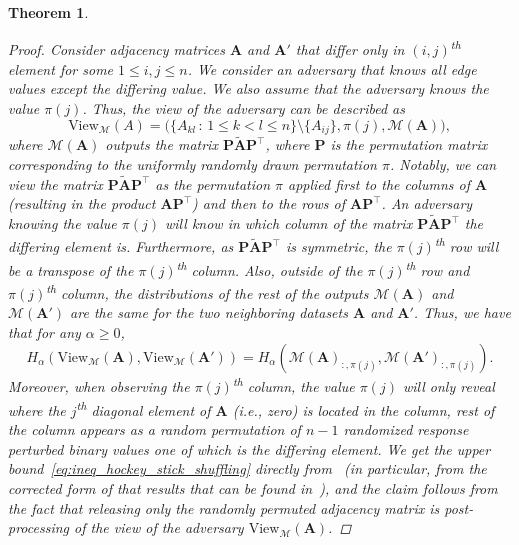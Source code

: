 \documentclass[11pt]{article}
\theoremstyle{plain}
\newtheorem{theorem}{Theorem}[section]
\theoremstyle{definition}
\theoremstyle{remark}
\newcommand{\view}[1]{\text{View}_{\mathcal M}(#1)}
\begin{document}
\begin{theorem}
\begin{proof}
Consider adjacency matrices $\mathbf{A}$ and $\mathbf{A}'$ that differ only in $(i,j)$\textsuperscript{th} element for some $1 \leq i,j \leq n$.
We consider an adversary that knows all edge values except the differing value. We also assume that the adversary knows the value $\pi(j)$. Thus, the view of the adversary can be described as
$$
\view{A} = \big( \{ A_{kl} \, : \, 1 \leq k < l \leq n\} \setminus \{A_{ij}\}, \pi(j), \mathcal{M}(\mathbf{A}) \big),
$$
where $\mathcal{M}(\mathbf{A})$ outputs the matrix $ \mathbf{P}\widetilde{\mathbf{A}}\mathbf{P}^{\top}$, where $ \mathbf{P}$ is the permutation matrix corresponding to the uniformly randomly drawn permutation $\pi$. Notably, we can view the matrix  $ \mathbf{P}\widetilde{\mathbf{A}}\mathbf{P}^{\top}$ as the permutation $\pi$ applied first to the columns of $\mathbf{A}$ (resulting in the product $\mathbf{A}\mathbf{P}^{\top}$) and then to the rows of $\mathbf{A}\mathbf{P}^{\top}$.
An adversary knowing the value $\pi(j)$ will know in which column of the matrix $ \mathbf{P}\widetilde{\mathbf{A}}\mathbf{P}^{\top}$ the differing element is. Furthermore, as $ \mathbf{P}\widetilde{\mathbf{A}}\mathbf{P}^{\top}$ is symmetric, the $\pi(j)$\textsuperscript{th} row will be a transpose of the $\pi(j)$\textsuperscript{th} column. Also, outside of the $\pi(j)$\textsuperscript{th} row and $\pi(j)$\textsuperscript{th} column, the distributions of the rest of the outputs $\mathcal{M}(\mathbf{A})$ and $\mathcal{M}(\mathbf{A}')$ are the same for the two neighboring datasets $\mathbf{A}$ and $\mathbf{A}'$. Thus, we have that for any $\alpha \geq 0$,
$$
H_{\alpha}\left( \view{\mathbf{A}} , \view{\mathbf{A}'} \right)
= H_{\alpha}\left( \mathcal{M}(\mathbf{A})_{:,\pi(j)} ,  \mathcal{M}(\mathbf{A}')_{:,\pi(j)} \right).
%
$$
Moreover, when observing the $\pi(j)$\textsuperscript{th} column, the value $\pi(j)$ will only reveal where the $j$\textsuperscript{th} diagonal element of $\mathbf{A}$ (i.e., zero) is located in the column, rest of the column appears as a random permutation of $n-1$ randomized response perturbed binary values one of which is the differing element. We get the upper bound~\eqref{eq:ineq_hockey_stick_shuffling} directly from~\citep[Thm.][]{feldman2023stronger} (in particular, from the corrected form of that results that can be found in~\citep{feldman2023stronger_arxiv}), and the claim follows from the fact that releasing only the randomly permuted adjacency matrix is post-processing of the view of the adversary $\view{\mathbf{A}}$.

    
\end{proof}


\end{theorem}
\end{document}
